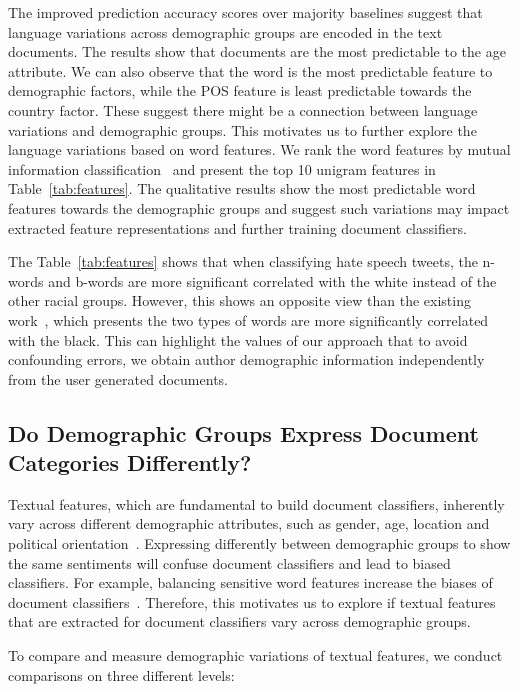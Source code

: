 The improved prediction accuracy scores over majority baselines suggest that language variations across demographic groups are encoded in the text documents. 
The results show that documents are the most predictable to the age attribute.
We can also observe that the word is the most predictable feature to demographic factors,
while the POS feature is least predictable towards the country factor.
These suggest there might be a connection between language variations and demographic groups.
This motivates us to further explore the language variations based on word features.
We rank the word features by mutual information classification~\cite{pedregosa2011scikit} and present the top 10 unigram features in Table~\ref{tab:features}.
The qualitative results show the most predictable word features towards the demographic groups and 
suggest such variations may impact extracted feature representations and further training document classifiers.

The Table~\ref{tab:features} shows that when classifying hate speech tweets, the n-words and b-words are more significant correlated with the white instead of the other racial groups.
However, this shows an opposite view than the existing work~\cite{davidson2019racial}, which presents the two types of words are more significantly correlated with the black.
This can highlight the values of our approach that to avoid confounding errors, we obtain author demographic information independently from the user generated documents.



\subsection{Do Demographic Groups Express Document Categories Differently?}
Textual features, which are fundamental to build document classifiers, inherently vary across different demographic attributes, such as gender, age, location and political orientation~\cite{gao2015more,hinds2018demographic}.
Expressing differently between demographic groups to show the same sentiments will confuse document classifiers and lead to biased classifiers.
For example, balancing sensitive word features increase the biases of document classifiers~\cite{dixon2018measuring}.
Therefore, this motivates us to explore if textual features that are extracted for document classifiers vary across demographic groups.

To compare and measure demographic variations of textual features, we conduct comparisons on three different levels:

